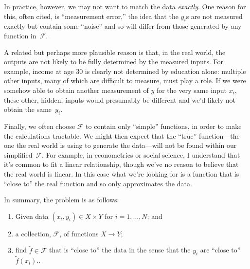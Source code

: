 \documentclass[10pt, a4paper]{article}
\begin{document}
In practice, however, we may not want to match the data
\emph{exactly}. One reason for this, often cited, is “measurement
error,” the idea that the $y_i$s are not measured exactly but contain
some “noise” and so will differ from those generated by any function
in~$\mathcal{F}$.

A related but perhaps more plausible reason is that, in the real
world, the outputs are not likely to be fully determined by the
measured inputs. For example, income at age 30 is clearly not
determined by education alone: multiple other inputs, many of which
are difficult to measure, must play a role. If we were somehow able to
obtain another measurement of $y$ for the very same input $x_i$, these
other, hidden, inputs would presumably be different and we'd likely
not obtain the same~$y_i$.

Finally, we often choose $\mathcal{F}$ to contain only “simple” functions, in
order to make the calculations tractable. We might then expect that
the “true” function---the one the real world is using to generate the
data---will not be found within our simplified~$\mathcal{F}$. For example, in
econometrics or social science, I understand that it's common to fit a
linear relationship, though we've no reason to believe that the real
world is linear. In this case what we're looking for is a function
that is “close to” the real function and so only approximates the
data.

In summary, the problem is as follows:
\begin{enumerate}
\item Given data $(x_i, y_i) \in X\times Y$ for $i=1,\dots,N$; and
\item a collection, $\mathcal{F}$, of functions $X\to Y$;
\item find $\tilde{f}\in\mathcal{F}$ that is “close to” the data in the sense that
  the $y_i$ are “close to”~$\tilde{f}(x_i)$..
\end{enumerate}
\end{document}
